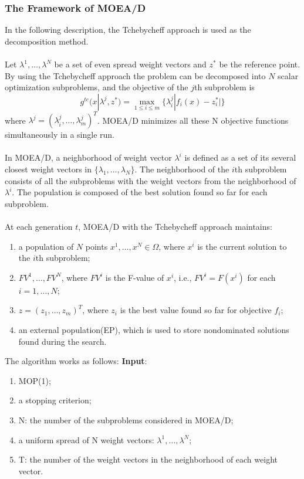 \documentclass[a4paper, 11pt]{article}
\begin{document}
\subsubsection{The Framework of MOEA/D}
In the following description, the Tchebycheff approach is used as the decomposition method.\\
\\
Let $\lambda^1,\ldots,\lambda^N$ be a set of even spread weight vectors and $z^\ast$ be the reference point. By using the Tchebycheff approach the problem can be decomposed into $N$ scalar optimization subproblems, and the objective of the $j$th subproblem is
\begin{equation}\label{eq:gte}
g^{te}(x|\lambda^j, z^\ast)=\max_{1\le i\le m}\{\lambda^j_i|f_i(x)-z^\ast_i|\}
\end{equation}
where $\lambda^j=(\lambda^j_i,\ldots, \lambda^j_m)^T$. MOEA/D minimizes all these N objective functions simultaneously in a single run.\\
\\
In MOEA/D, a neighborhood of weight vector $\lambda^i$ is defined as a set of its several closest weight vectors in $\{\lambda_1,\ldots,\lambda_N\}$.
The neighborhood of the $i$th subproblem consists of all the subproblems with the weight vectors from the neighborhood of $\lambda^i$.
The population is composed of the best solution found so far for each subproblem.\\
\\
At each generation $t$, MOEA/D with the Tchebycheff approach maintains:
\begin{enumerate}[~~$\bullet$~~]
\item a population of $N$ points $x^1,\ldots,x^N\in\Omega$, where $x^i$ is the current solution to the $i$th subproblem;
\item $FV^1,\ldots,FV^N$, where $FV^i$ is the F-value of $x^i$, i.e., $FV^i=F(x^i)$ for each $i=1,\ldots,N$;
\item $z=(z_1,\ldots,z_m)^T$, where $z_i$ is the best value found so far for objective $f_i$;
\item an external population(EP), which is used to store nondominated solutions found during the search.
\end{enumerate}
The algorithm works as follows:\newline
\textbf{Input}:
\begin{enumerate}[~~$\bullet$~~]
\item MOP(1);
\item a stopping criterion;
\item N: the number of the subproblems considered in MOEA/D;
\item a uniform spread of N weight vectors: $\lambda^1,\ldots,\lambda^N$;
\item T: the number of the weight vectors in the neighborhood of each weight vector.
\end{enumerate}
\end{document}
